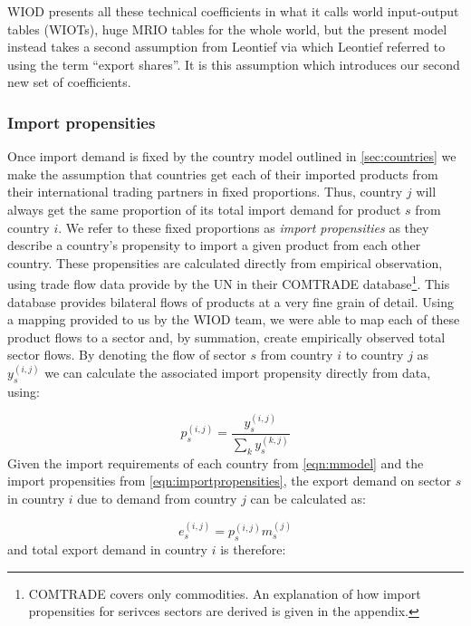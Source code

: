 \documentclass{article}
\begin{document}
WIOD presents all these technical coefficients in what it calls world input-output tables (WIOTs), huge MRIO tables for the whole world, but the present model instead takes a second assumption from Leontief via \textcite{duchin_international_2004} which Leontief referred to using the term ``export shares''.
It is this assumption which introduces our second new set of coefficients.

\subsubsection*{Import propensities}
Once import demand is fixed by the country model outlined in \cref{sec:countries} we make the assumption that countries get each of their imported products from their international trading partners in fixed proportions.
Thus, country $j$ will always get the same proportion of its total import demand for product $s$ from country $i$.
We refer to these fixed proportions as \textit{import propensities} as they describe a country's propensity to import a given product from each other country.
These propensities are calculated directly from empirical observation, using trade flow data provide by the UN in their COMTRADE database\footnote{COMTRADE covers only commodities. An explanation of how import propensities for serivces sectors are derived is given in the appendix.}.
This database provides bilateral flows of products at a very fine grain of detail.
Using a mapping provided to us by the WIOD team, we were able to map each of these product flows to a sector and, by summation, create empirically observed total sector flows.
By denoting the flow of sector $s$ from country $i$ to country $j$ as $y_s^{(i,j)}$ we can calculate the associated import propensity directly from data, using:

\begin{equation}\label{eqn:importpropensities}
p^{(i,j)}_s = \frac{y^{(i,j)}_s}{\sum_k{y^{(k,j)}_s}}
\end{equation}
Given the import requirements of each country from \cref{eqn:mmodel} and the import propensities from \cref{eqn:importpropensities}, the export demand on sector $s$ in country $i$ due to demand from country $j$ can be calculated as:

\begin{equation}
e_s^{(i,j)} = p_s^{(i,j)}m_s^{(j)}
\end{equation}
and total export demand in country $i$ is therefore:
\end{document}
